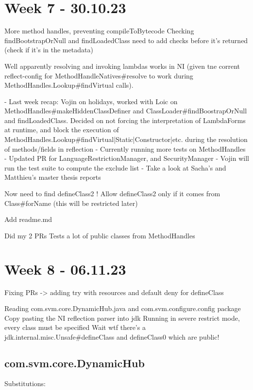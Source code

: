 \section{Week 7 - 30.10.23}
More method handles, preventing compileToBytecode
Checking findBootstrapOrNull and findLoadedClass need to add checks before it's returned
(check if it's in the metadata)

Well apparently resolving and invoking lambdas works in NI (given tne corrent reflect-config for MethodHandleNatives\#resolve to work during MethodHandles.Lookup\#findVirtual calls).

- Last week recap: Vojin on holidays, worked with Loic on MethodHandles\#makeHiddenClassDefiner and ClassLoader\#findBoostrapOrNull and findLoadedClass. Decided on not forcing the interpretation of LambdaForms at runtime, and block the execution of MethodHandles.Lookup\#findVirtual|Static|Constructor|etc. during the resolution of methods/fields in reflection 
- Currently running more tests on MethodHandles
- Updated PR for LanguageRestrictionManager, and SecurityManager 
- Vojin will run the test suite to compute the exclude list
- Take a look at Sacha’s and Matthieu’s master thesis reports

Now need to find defineClass2 !
Allow defineClass2 only if it comes from Class\#forName (this will be restricted later)


Add readme.md

Did my 2 PRs
Tests a lot of public classes from MethodHandles

\section{Week 8 - 06.11.23}
Fixing PRs -> adding try with resources and default deny for defineClass

Reading com.svm.core.DynamicHub.java and com.svm.configure.config package
Copy pasting the NI reflection parser into jdk
Running in severe restrict mode, every class must be specified
Wait wtf there's a jdk.internal.misc.Unsafe\#defineClass and defineClass0 which are public!

\subsection{com.svm.core.DynamicHub}

Substitutions:

